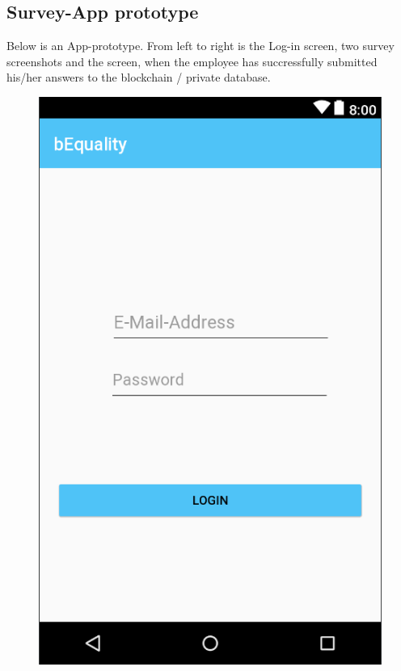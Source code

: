 \documentclass[portrait,a4paper]{article}
\begin{document}
	\subsection{Survey-App prototype}
		Below is an App-prototype. From left to right is the Log-in screen, two survey screenshots and the screen, when the
		employee has succressfully submitted his/her answers to the blockchain / private database.
		\begin{figure}[!htb]
  				\includegraphics[width=\linewidth]{Bilder/App_1_Log-in}
  				

\end{figure}
\end{document}
